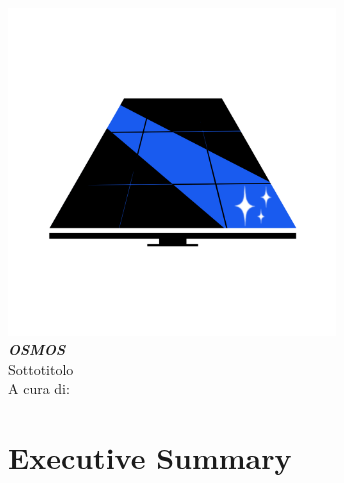 \documentclass[a4paper, 12pt]{article}
\begin{document}
	
	\linespread{1}
	
	
	\vspace{4cm}
	\begin{center}
		\includegraphics[width=0.65\textwidth]{Images/LogoGIP.png}\\
		{\Huge \emph{\textbf{OSMOS}}}\\
		\vspace{0.5cm}
		{\large Sottotitolo}\\
		\vspace{1cm}
		A cura di:
	\end{center}
	\newpage
	
	\tableofcontents
	\newpage
	
	\section{Executive Summary}
	\newpage
\end{document}

